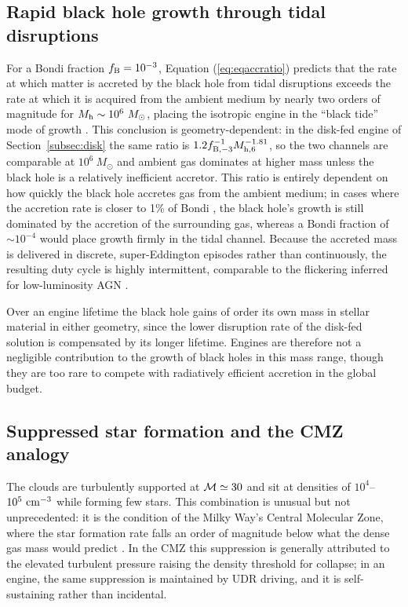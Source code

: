 \documentclass[preprint2]{aastex}
\newcommand{\msun}{M_{\odot}\xspace}
\newcommand{\mhsix}{M_{\rm h,6}\xspace}
\begin{document}
\subsection{Rapid black hole growth through tidal disruptions}\label{subsec:growth}

For a Bondi fraction $f_{\rm B} = 10^{-3}$, Equation (\ref{eq:eqaccratio}) predicts that the rate at which matter is accreted by the black hole from tidal disruptions exceeds the rate at which it is acquired from the ambient medium by nearly two orders of magnitude for $M_{\rm h} \sim 10^{6}~\msun$, placing the isotropic engine in the ``black tide'' mode of growth \citep{Young:1977a}. This conclusion is geometry-dependent: in the disk-fed engine of Section~\ref{subsec:disk} the same ratio is $1.2 f_{\rm B,-3}^{-1}\mhsix^{-1.81}$, so the two channels are comparable at $10^{6}~\msun$ and ambient gas dominates at higher mass unless the black hole is a relatively inefficient accretor. This ratio is entirely dependent on how quickly the black hole accretes gas from the ambient medium; in cases where the accretion rate is closer to 1\% of Bondi \citep[e.g. M87,][]{Kuo:2014a}, the black hole's growth is still dominated by the accretion of the surrounding gas, whereas a Bondi fraction of $\sim 10^{-4}$ \citep[e.g. the MW,][]{Quataert:2000a} would place growth firmly in the tidal channel. Because the accreted mass is delivered in discrete, super-Eddington episodes rather than continuously, the resulting duty cycle is highly intermittent, comparable to the flickering inferred for low-luminosity AGN \citep{Schawinski:2015a}.

Over an engine lifetime the black hole gains of order its own mass in stellar material in either geometry, since the lower disruption rate of the disk-fed solution is compensated by its longer lifetime. Engines are therefore not a negligible contribution to the growth of black holes in this mass range, though they are too rare to compete with radiatively efficient accretion in the global budget.

\subsection{Suppressed star formation and the CMZ analogy}\label{subsec:sf}

The clouds are turbulently supported at ${\cal M} \simeq 30$ and sit at densities of $10^{4}$--$10^{5}~{\rm cm}^{-3}$ while forming few stars. This combination is unusual but not unprecedented: it is the condition of the Milky Way's Central Molecular Zone, where the star formation rate falls an order of magnitude below what the dense gas mass would predict \citep{Longmore:2013a,Kruijssen:2014a,Barnes:2017a}. In the CMZ this suppression is generally attributed to the elevated turbulent pressure raising the density threshold for collapse; in an engine, the same suppression is maintained by UDR driving, and it is self-sustaining rather than incidental.
\end{document}
